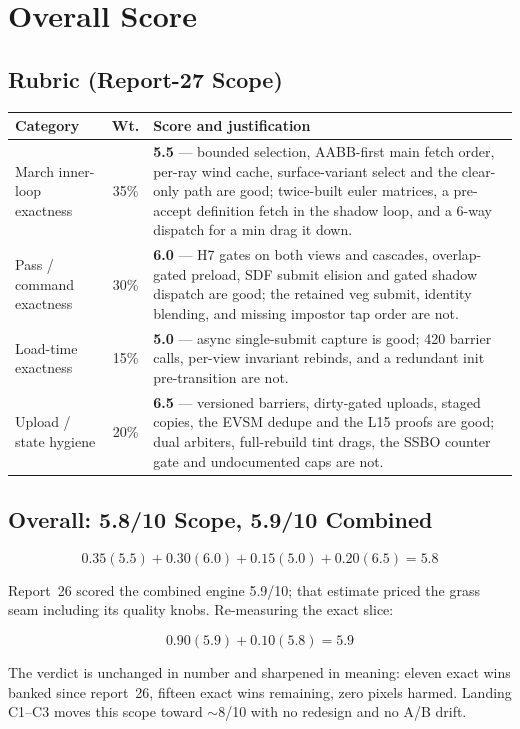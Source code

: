\documentclass[11pt,a4paper]{article}
\begin{document}
\section{Overall Score}
\label{sec:score27}

\subsection{Rubric (Report-27 Scope)}

\begin{table}[h]
\centering
\small
\begin{tabular}{@{}lcp{7.2cm}@{}}
\toprule
\textbf{Category} & \textbf{Wt.} & \textbf{Score and justification} \\
\midrule
March inner-loop exactness & 35\% & \textbf{5.5} --- bounded selection,
AABB-first main fetch order, per-ray wind cache, surface-variant select
and the clear-only path are good; twice-built euler matrices, a
pre-accept definition fetch in the shadow loop, and a 6-way dispatch for
a min drag it down. \\
Pass / command exactness & 30\% & \textbf{6.0} --- H7 gates on both views
and cascades, overlap-gated preload, SDF submit elision and gated shadow
dispatch are good; the retained veg submit, identity blending, and missing
impostor tap order are not. \\
Load-time exactness & 15\% & \textbf{5.0} --- async single-submit capture
is good; 420 barrier calls, per-view invariant rebinds, and a redundant
init pre-transition are not. \\
Upload / state hygiene & 20\% & \textbf{6.5} ---
versioned barriers, dirty-gated uploads, staged copies, the EVSM dedupe
and the L15 proofs are good; dual arbiters, full-rebuild tint drags, the
SSBO counter gate and undocumented caps are not. \\
\bottomrule
\end{tabular}
\end{table}

\subsection{Overall: 5.8/10 Scope, 5.9/10 Combined}

\begin{equation}
0.35(5.5) + 0.30(6.0) + 0.15(5.0) + 0.20(6.5) = \mathbf{5.8}
\end{equation}

Report~26 scored the combined engine 5.9/10; that estimate priced the grass
seam including its quality knobs. Re-measuring the exact slice:

\begin{equation}
0.90(5.9) + 0.10(5.8) = \mathbf{5.9}
\end{equation}

The verdict is unchanged in number and sharpened in meaning: eleven exact
wins banked since report~26, fifteen exact wins remaining, zero pixels
harmed. Landing C1--C3 moves this scope toward $\sim$8/10 with no redesign
and no A/B drift.
\end{document}
